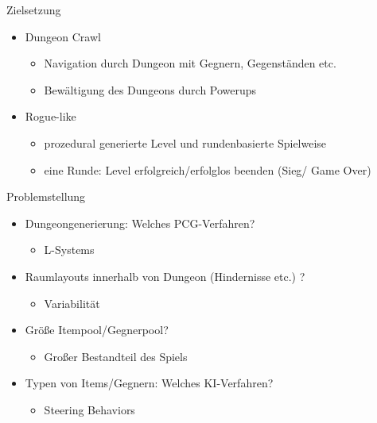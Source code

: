 \begin{frame}{Zielsetzung}
\begin{itemize}
\item Dungeon Crawl
\begin{itemize}
    \item Navigation durch Dungeon mit Gegnern, Gegenständen etc.
    \item Bewältigung des Dungeons durch Powerups
\end{itemize}
\item Rogue-like
\begin{itemize}
    \item prozedural generierte Level und rundenbasierte Spielweise
    \item eine Runde: Level erfolgreich/erfolglos beenden (Sieg/ Game Over)
\end{itemize}
\end{itemize}
\end{frame}

\begin{frame}{Problemstellung}
\begin{itemize}
    \item Dungeongenerierung: Welches PCG-Verfahren? 
    \begin{itemize}
        \item L-Systems
    \end{itemize}
    \item Raumlayouts innerhalb von Dungeon (Hindernisse etc.) ?
    \begin{itemize}
        \item Variabilität
    \end{itemize}
    \item Größe Itempool/Gegnerpool?
    \begin{itemize}
        \item Großer Bestandteil des Spiels
    \end{itemize}
    \item Typen von Items/Gegnern: Welches KI-Verfahren?
    \begin{itemize}
        \item Steering Behaviors
    \end{itemize}
\end{itemize}
\end{frame}